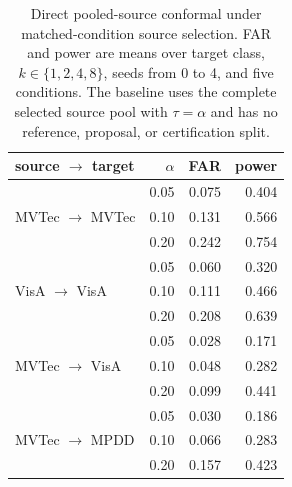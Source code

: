 \begin{table}[pos=t]
\centering
\caption{Direct pooled-source conformal under matched-condition source selection. FAR and power are means over target class, $k\in\{1,2,4,8\}$, seeds from 0 to 4, and five conditions. The baseline uses the complete selected source pool with $\tau=\alpha$ and has no reference, proposal, or certification split.}
\label{tab:pooled-source-conformal}
\footnotesize
\setlength{\tabcolsep}{4pt}
\begin{tabular}{lrrr}
\toprule
source $\rightarrow$ target & $\alpha$ & FAR & power \\
\midrule
\multirow{3}{*}{MVTec $\rightarrow$ MVTec}
 & 0.05 & 0.075 & 0.404 \\
 & 0.10 & 0.131 & 0.566 \\
 & 0.20 & 0.242 & 0.754 \\
\cmidrule(lr){1-4}
\multirow{3}{*}{VisA $\rightarrow$ VisA}
 & 0.05 & 0.060 & 0.320 \\
 & 0.10 & 0.111 & 0.466 \\
 & 0.20 & 0.208 & 0.639 \\
\cmidrule(lr){1-4}
\multirow{3}{*}{MVTec $\rightarrow$ VisA}
 & 0.05 & 0.028 & 0.171 \\
 & 0.10 & 0.048 & 0.282 \\
 & 0.20 & 0.099 & 0.441 \\
\cmidrule(lr){1-4}
\multirow{3}{*}{MVTec $\rightarrow$ MPDD}
 & 0.05 & 0.030 & 0.186 \\
 & 0.10 & 0.066 & 0.283 \\
 & 0.20 & 0.157 & 0.423 \\
\bottomrule
\end{tabular}
\end{table}
